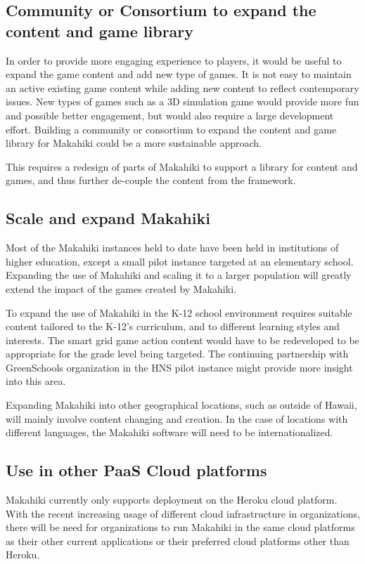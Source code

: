 \subsection{Community or Consortium to expand the content and game library}

In order to provide more engaging experience to players, it would be useful to expand the game content and add new type of games. It is not easy to maintain an active existing game content while adding new content to reflect contemporary issues. New types of games such as a 3D simulation game would provide more fun and possible better engagement, but would also require a large development effort. Building a community or consortium to expand the content and game library for Makahiki could be a more sustainable approach. 

This requires a redesign of parts of Makahiki to support a library for content and games, and thus further de-couple the content from the framework.

\subsection{Scale and expand Makahiki}

Most of the Makahiki instances held to date have been held in institutions of higher education, except a small pilot instance targeted at an elementary school. Expanding the use of Makahiki and scaling it to a larger population will greatly extend the impact of the games created by Makahiki.

To expand the use of Makahiki in the K-12 school environment requires suitable content tailored to the K-12's curriculum, and to different learning styles and interests. The smart grid game action content would have to be redeveloped to be appropriate for the grade level being targeted. The continuing partnership with GreenSchools organization in the HNS pilot instance might provide more insight into this area.

Expanding Makahiki into other geographical locations, such as outside of Hawaii, will mainly involve content changing and creation. In the case of locations with different languages, the Makahiki software will need to be internationalized. 

\subsection{Use in other PaaS Cloud platforms}
Makahiki currently only supports deployment on the Heroku cloud platform. With the recent increasing usage of different cloud infrastructure in organizations, there will be need for organizations to run Makahiki in the same cloud platforms as their other current  applications or their preferred cloud platforms other than Heroku. 

